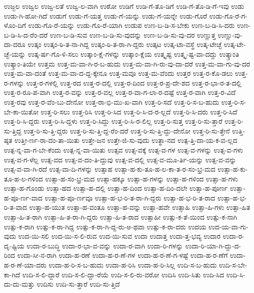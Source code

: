 {ಉಜ್ಜಲ
ಉಜ್ವಲ
ಉಜ್ವ-ಲತೆ
ಉಜ್ವ-ಲ-ವಾಗಿ
ಉಠೋ
ಉಡಿಗೆ
ಉಡಿ-ಗೆ-ತೊ-ಡಿಗೆ
ಉಡಿ-ಗೆ-ತೊ-ಡಿ-ಗೆ-ಇವು
ಉಡು
ಉಡು-ಗಿ-ಹೋ-ಗಿದೆ
ಉಡುಗೆ
ಉಡು-ಗೆ-ಯತ್ತ
ಉಡು-ಗೆ-ಯನ್ನು
ಉಡು-ಗೆ-ಯನ್ನೇ
ಉಡು-ಗೊರೆ
ಉಡು-ಗೊ-ರೆ-ಗ-ಳೊಂ-ದಿಗೆ
ಉಡು-ಗೊ-ರೆ-ಯನ್ನು
ಉಡು-ಗೊ-ರೆ-ಯಾಗಿ
ಉಡುಪ
ಉಣ-ಬ-ಡಿ-ಸ-ಬೇಕು
ಉಣ-ಬ-ಡಿ-ಸಿ-ದರು
ಉಣ-ಬ-ಡಿ-ಸಿ-ದ-ರೆಂ-ದರೆ
ಉಣ-ಬ-ಡಿ-ಸುವ
ಉಣ-ಬ-ಡಿ-ಸು-ವುದನ್ನು
ಉಣ-ಬ-ಡಿ-ಸು-ವು-ದರ
ಉಣ್ಣುತ್ತ
ಉಣ್ಣು-ವು-ದಾ-ದರೂ
ಉತ್ಕಂ
ಉತ್ಕಂ-ಠಿ-ತ-ನಾ-ಗಿದ್ದ
ಉತ್ಕಂ-ಠಿ-ತ-ರಾ-ಗಿ-ದ್ದರು
ಉತ್ಕಟ
ಉತ್ಕ-ಟಾ-ವಸ್ಥೆ
ಉತ್ಕ-ಟೇಚ್ಛೆ
ಉತ್ಕ-ಟೇ-ಚ್ಛೆ-ಯನ್ನು
ಉತ್ಕ-ರ್ಷ-ಗೊ-ಳಿ-ಸಲು
ಉತ್ಕಾಂ-ಕ್ಷೆ-ಗಳನ್ನು
ಉತ್ಕಾಂ-ಕ್ಷೆಯ
ಉತ್ಕೃಷ್ಟ
ಉತ್ಕೃ-ಷ್ಟ-ವಾ-ದದ್ದು
ಉತ್ಕ್ರಾಂತಿ
ಉತ್ಕ್ರಾಂ-ತಿಯೇ
ಉತ್ತಮ
ಉತ್ತ-ಮ-ವಾ-ಗಿ-ರ-ಬ-ಹುದು
ಉತ್ತ-ಮ-ವಾ-ಗಿ-ರು-ವು-ದಾ-ದರೆ
ಉತ್ತ-ಮ-ವಾ-ಗು-ವು-ದರ
ಉತ್ತ-ಮ-ವಾ-ದಂತೆ
ಉತ್ತ-ಮ-ವಾ-ದ-ದ್ದ-ಕ್ಕೇನೂ
ಉತ್ತ-ಮವೂ
ಉತ್ತ-ಮ-ವೆಂದು
ಉತ್ತರ
ಉತ್ತ-ರ-ಕೊ-ಡಲು
ಉತ್ತ-ರ-ಗಳನ್ನು
ಉತ್ತ-ರ-ಗಳಲ್ಲಿ
ಉತ್ತ-ರದ
ಉತ್ತ-ರ-ದಲ್ಲಿ
ಉತ್ತ-ರ-ದಿಂದ
ಉತ್ತ-ರ-ಪ್ರ-ದೇ-ಶದ
ಉತ್ತ-ರ-ಭಾ-ರ-ತ-ದಲ್ಲಿ
ಉತ್ತ-ರ-ರೂ-ಪ-ವಾಗಿ
ಉತ್ತ-ರ-ವನ್ನು
ಉತ್ತ-ರ-ವಲ್ಲ
ಉತ್ತ-ರ-ವಾ-ಗ-ಲಾ-ರ-ದಷ್ಟೆ
ಉತ್ತ-ರ-ವಾಗಿ
ಉತ್ತ-ರ-ವಿದೆ
ಉತ್ತ-ರವು
ಉತ್ತ-ರ-ವೆಂ-ಬು-ದೇನೋ
ಉತ್ತ-ರಾ-ಭಿ-ಮು-ಖ-ವಾಗಿ
ಉತ್ತ-ರಿ-ಸದೆ
ಉತ್ತ-ರಿ-ಸ-ಬ-ಹುದು
ಉತ್ತ-ರಿ-ಸ-ಬೇ-ಕಾ-ಯಿತೋ
ಉತ್ತ-ರಿ-ಸಲು
ಉತ್ತ-ರಿಸಿ
ಉತ್ತ-ರಿ-ಸಿದ
ಉತ್ತ-ರಿ-ಸಿ-ದ-ರ-ಲ್ಲದೆ
ಉತ್ತ-ರಿ-ಸಿ-ದರು
ಉತ್ತ-ರಿ-ಸಿದೆ
ಉತ್ತ-ರಿ-ಸಿ-ದ್ದರು
ಉತ್ತ-ರಿ-ಸಿ-ದ್ದಳು
ಉತ್ತ-ರಿ-ಸಿದ್ದು
ಉತ್ತ-ರಿ-ಸಿ-ರ-ಲಿಲ್ಲ
ಉತ್ತ-ರಿ-ಸುತ್ತ
ಉತ್ತ-ರಿ-ಸು-ತ್ತಾರೆ
ಉತ್ತ-ರಿ-ಸು-ತ್ತಿದ್ದ
ಉತ್ತ-ರಿ-ಸು-ತ್ತಿ-ದ್ದರು
ಉತ್ತ-ರಿ-ಸು-ತ್ತಿ-ದ್ದ-ರೆಂ-ದರೆ
ಉತ್ತ-ರಿ-ಸು-ತ್ತಿ-ದ್ದು-ದೇನೋ
ಉತ್ತ-ರಿ-ಸು-ತ್ತೇನೆ
ಉತ್ತಿ-ಷ್ಠತ
ಉತ್ತೀ-ರ್ಣ-ರಾ-ದಂ-ತಾ-ಯಿತು
ಉತ್ತೇ-ಜನ
ಉತ್ತೇ-ಜಿ-ಸು-ವುದು
ಉತ್ಥಾ-ನದ
ಉತ್ಪ-ತ್ತಿ-ದಾ-ಯ-ಕ-ವ-ಲ್ಲದ
ಉತ್ಪ-ನ್ನ-ವಾ-ಗ-ಬೇ-ಕೆಂದು
ಉತ್ಪ-ನ್ನ-ವಾ-ಯಿತು
ಉತ್ಸವ
ಉತ್ಸ-ವಕ್ಕೆ
ಉತ್ಸ-ವ-ಗಳ
ಉತ್ಸ-ವ-ಗಳನ್ನು
ಉತ್ಸ-ವ-ಗಳು
ಉತ್ಸ-ವ-ಗ-ಳೆಲ್ಲ
ಉತ್ಸ-ವದ
ಉತ್ಸ-ವ-ದಂ-ತಿ-ದ್ದುವು
ಉತ್ಸ-ವ-ದಲ್ಲಿ
ಉತ್ಸ-ವ-ಮೂ-ರ್ತಿ-ಯನ್ನು
ಉತ್ಸ-ವ-ವನ್ನು
ಉತ್ಸ-ವ-ವಾ-ಗಿ-ರದೆ
ಉತ್ಸ-ವಾ-ದಿ-ಗಳನ್ನು
ಉತ್ಸಾಹ
ಉತ್ಸಾ-ಹ-ಕು-ತೂ-ಹ-ಲ-ಕಾ-ತ-ರ-ಸಂ-ಭ್ರ-ಮದ
ಉತ್ಸಾ-ಹ-ಕು-ತೂ-ಹ-ಲ-ಗಳಿಂದ
ಉತ್ಸಾ-ಹ-ಸಂ-ಭ್ರ-ಮದ
ಉತ್ಸಾ-ಹಕ್ಕೂ
ಉತ್ಸಾ-ಹ-ಗಳನ್ನು
ಉತ್ಸಾ-ಹ-ಗಳಿಂದ
ಉತ್ಸಾ-ಹ-ಗಳು
ಉತ್ಸಾ-ಹ-ಗೊಂಡು
ಉತ್ಸಾ-ಹದ
ಉತ್ಸಾ-ಹ-ದಲ್ಲಿ
ಉತ್ಸಾ-ಹ-ದಿಂದ
ಉತ್ಸಾ-ಹ-ದಿಂ-ದಲೇ
ಉತ್ಸಾ-ಹ-ಪೂರ್ಣ
ಉತ್ಸಾ-ಹ-ಪೂ-ರ್ಣ-ವಾದ
ಉತ್ಸಾ-ಹ-ಪೂ-ರ್ಣವೂ
ಉತ್ಸಾ-ಹ-ಭ-ರಿ-ತ-ರಾ-ಗಿ-ದ್ದರು
ಉತ್ಸಾ-ಹ-ಭ-ರಿ-ತ-ರಾದ
ಉತ್ಸಾ-ಹ-ಭ-ರಿ-ತ-ವಾದ
ಉತ್ಸಾ-ಹ-ಯುತ
ಉತ್ಸಾ-ಹ-ವಂತೂ
ಉತ್ಸಾ-ಹ-ವನ್ನು
ಉತ್ಸಾ-ಹವೇ
ಉತ್ಸಾಹಿ
ಉತ್ಸಾ-ಹಿ-ಗಳು
ಉತ್ಸಾ-ಹಿತ
ಉತ್ಸಾ-ಹಿ-ತ-ರಾಗಿ
ಉತ್ಸಾ-ಹಿ-ತ-ರಾ-ಗಿ-ದ್ದರು
ಉತ್ಸಾ-ಹಿ-ತ-ರಾದ
ಉತ್ಸಾಹೀ
ಉತ್ಸು-ಕ-ತೆ-ಯಿಂದ
ಉತ್ಸು-ಕ-ನಾಗಿ
ಉತ್ಸು-ಕ-ರಾಗಿ
ಉತ್ಸು-ಕ-ರಾ-ಗಿದ್ದ
ಉತ್ಸು-ಕ-ರಾ-ಗಿ-ದ್ದ-ರು-ಅ-ಥವಾ
ಉತ್ಸು-ಕ-ರಾ-ದರು
ಉದಯ
ಉದ-ಯ-ವಾ-ಗು-ವುದು
ಉದ-ಯಿ-ಸಲಿ
ಉದ-ಯಿ-ಸ-ಲಿ-ರುವ
ಉದ-ಯಿ-ಸುವ
ಉದಾ
ಉದಾತ್ತ
ಉದಾ-ತ್ತ-ಭವ್ಯ
ಉದಾರ
ಉದಾ-ರ-ದೃ-ಷ್ಟಿಯ
ಉದಾ-ರ-ಬುದ್ಧಿ
ಉದಾ-ರ-ಭಾ-ವ-ವನ್ನು
ಉದಾ-ರ-ವಾಗಿ
ಉದಾ-ರಿ-ಗಳನ್ನು
ಉದಾ-ರಿ-ಯಾ-ಗಿ-ದ್ದು-ದ-ರಿಂದ
ಉದಾ-ಸೀ-ನ-ರಾಗಿ
ಉದಾ-ಹ-ರಣೆ
ಉದಾ-ಹ-ರ-ಣೆ-ಗಳ
ಉದಾ-ಹ-ರ-ಣೆ-ಗ-ಳಷ್ಟೆ
ಉದಾ-ಹ-ರ-ಣೆಗೆ
ಉದಾ-ಹ-ರ-ಣೆ-ಯಾ-ದರು
ಉದಾ-ಹ-ರಿ-ಸ-ಬ-ಹುದು
ಉದಾ-ಹ-ರಿಸಿ
ಉದಾ-ಹ-ರಿ-ಸಿಲ್ಲ
ಉದಿ-ಸ-ಬ-ಹುದು
ಉದಿ-ಸ-ಬೇ-ಕಾ-ಗಿದೆ
ಉದಿ-ಸ-ಲಿ-ದ್ದಾರೆ
ಉದಿ-ಸ-ಲಿ-ದ್ದಾ-ರೆಯೆ
ಉದಿ-ಸ-ಲಿ-ರು-ವರೋ
ಉದಿಸಿ
ಉದಿ-ಸಿತು
ಉದಿ-ಸಿದ
ಉದಿ-ಸಿ-ದು-ದು-ಮತ್ತು
ಉದಿಸು
ಉದಿ-ಸು-ತ್ತಾರೆ
ಉದಿ-ಸು-ತ್ತಿದೆ
}
